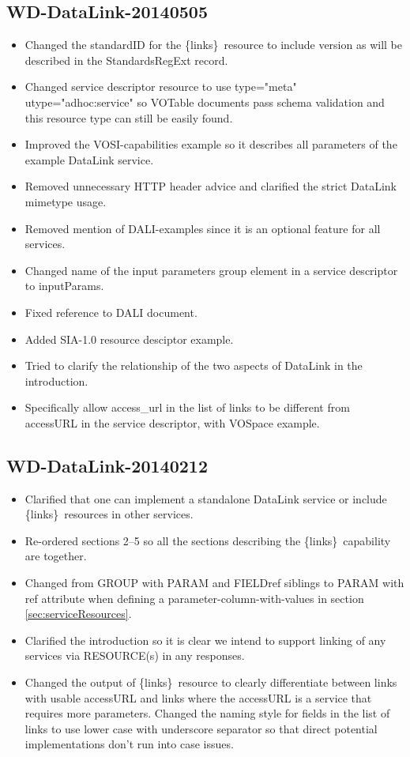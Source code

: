 \documentclass[11pt,a4paper]{ivoa}
\newcommand{\blinks}{\{links\}}
\newcommand{\attval}[2]{#1={\allowbreak}{"}#2{"}}
\begin{document}
\subsection{WD-DataLink-20140505}

\begin{itemize}
\item
Changed the standardID for the \blinks\ resource to include version as
will be described in the StandardsRegExt record.
\item
Changed service descriptor resource to use
\attval{type}{meta} \attval{utype}{adhoc:service}
so VOTable documents pass schema validation and this resource type can
still be easily found.
\item
Improved the VOSI-capabilities example so it describes all parameters
of the example DataLink service.
\item
Removed unnecessary HTTP header advice and clarified the strict DataLink
mimetype usage.
\item
Removed mention of DALI-examples since it is an optional feature for
all services.
\item
Changed name of the input parameters group element in a service descriptor
to inputParams.
\item
Fixed reference to DALI document.
\item
Added SIA-1.0 resource desciptor example.
\item
Tried to clarify the relationship of the two aspects of DataLink in
the introduction.
\item
Specifically allow access\_url in the list of links to be different from
accessURL in the service descriptor, with VOSpace example.
\end{itemize}


\subsection{WD-DataLink-20140212}

\begin{itemize}
\item
Clarified that one can implement a standalone DataLink service or include
\blinks\ resources in other services.
\item
Re-ordered sections 2--5 so all the sections describing the
\blinks\ capability are together.
\item
Changed from GROUP with PARAM and FIELDref siblings to PARAM with ref
attribute when defining a parameter-column-with-values in section
\ref{sec:serviceResources}.
\item
Clarified the introduction so it is clear we intend to support linking
of any services via RESOURCE(s) in any responses.
\item
Changed the output of \blinks\ resource to clearly differentiate between
links with usable accessURL and links where the accessURL is a service
that requires more parameters. Changed the naming style for fields in
the list of links to use lower case with underscore separator so that
direct potential implementations don't run into case issues.
\end{itemize}
\end{document}
